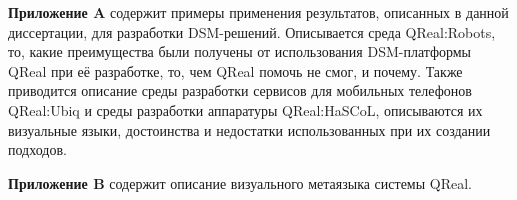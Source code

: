 \textbf{Приложение A} содержит примеры применения результатов, описанных в данной 
диссертации, для разработки \ac{DSM}-решений. Описывается среда QReal:Robots, то, 
какие преимущества были получены от использования \ac{DSM}-платформы QReal при её 
разработке, то, чем QReal помочь не смог, и почему. Также приводится 
описание среды разработки сервисов для мобильных телефонов QReal:Ubiq и среды
разработки аппаратуры QReal:HaSCoL, описываются их визуальные языки, 
достоинства и недостатки использованных при их создании подходов.

\textbf{Приложение B} содержит описание визуального метаязыка системы QReal.
